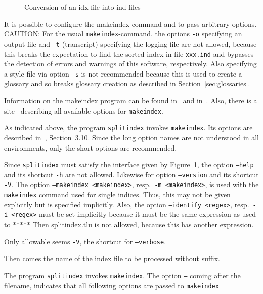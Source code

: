 \begin{figure}[htb]
\centering
{}
\caption{\label{fig:idx2indSplit}Conversion of an \gls{idx} file into ind files}
\end{figure}

It is possible to configure the makeindex-command 
and to pass arbitrary options. 
CAUTION\@: For the usual \texttt{makeindex}-command, 
the options \texttt{-o} specifying an output file 
and \texttt{-t} (transcript) specifying the logging file are not allowed, 
because this breaks the expectation to find the sorted index 
in file \texttt{xxx.ind} 
and bypasses the detection of errors and warnings of this software, 
respectively. 
Also specifying a style file via option \texttt{-s} 
is not recommended because this is used to create a glossary 
and so breaks glossary creation 
as described in Section~\ref{sec:glossaries}. 

Information on the makeindex program can be found in~\cite{MkIdxMoe} 
and in~\cite{MkIdxLam}. 
Also, there is a site~\cite{MakeIdxOpts} 
describing all available options for \texttt{makeindex}. 

As indicated above, the program \texttt{splitindex} 
invokes \texttt{makeindex}. 
Its options are described in~\cite{SplitidxP}, Section~3.10. 
Since the long option names are not understood in all environments, 
only the short options are recommended. 

Since \texttt{splitindex} must satisfy the interface 
given by Figure~\ref{fig:idx2indSplit}, 
the option \texttt{--help} and its shortcut \texttt{-h} are not allowed. 
Likewise for option \texttt{--version} and its shortcut \texttt{-V}. 
The option \texttt{--makeindex <makeindex>}, resp.~\texttt{-m <makeindex>}, 
is used with the \texttt{makeindex} command used for single indices. 
Thus, this may not be given explicitly but is specified implicitly. 
Also, the option \texttt{--identify <regex>}, resp.~\texttt{-i <regex>} 
must be set implicitly because it must be the same expression 
as used to ***** 
Then splitindex.tlu is not allowed, 
because this has another expression. 

Only allowable seems \texttt{-V}, the shortcut for \texttt{--verbose}. 

Then comes the name of the index file to be processed 
without suffix. 

The program \texttt{splitindex} invokes \texttt{makeindex}. 
The option \texttt{--} coming after the filename, 
indicates that all following options are passed to \texttt{makeindex} 



